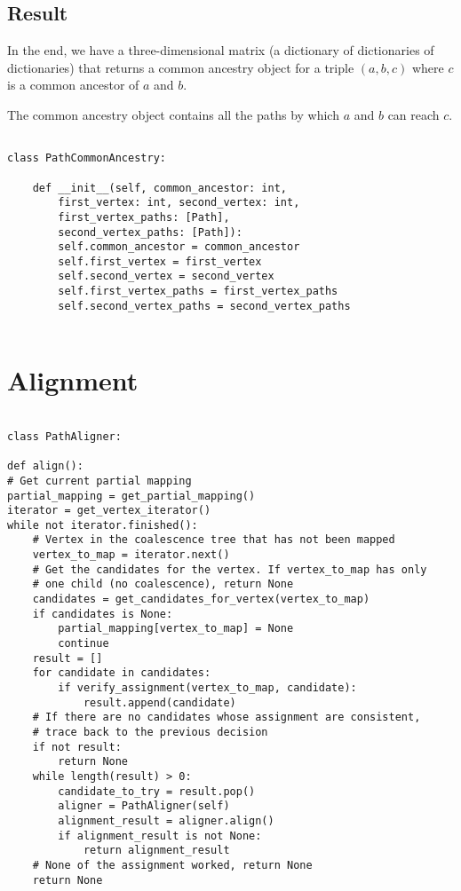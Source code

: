 \documentclass[14pt]{extarticle}
\begin{document}
\subsection{Result}

In the end, we have a three-dimensional matrix (a dictionary of dictionaries of dictionaries) that returns a common ancestry object for a triple $(a, b, c)$ where $c$ is a common ancestor of $a$ and $b$.

The common ancestry object contains all the paths by which $a$ and $b$ can reach $c$.

\begin{lstlisting}

class PathCommonAncestry:
	
	def __init__(self, common_ancestor: int,
		first_vertex: int, second_vertex: int,
		first_vertex_paths: [Path],
		second_vertex_paths: [Path]):
		self.common_ancestor = common_ancestor
		self.first_vertex = first_vertex
		self.second_vertex = second_vertex
		self.first_vertex_paths = first_vertex_paths
		self.second_vertex_paths = second_vertex_paths
	

\end{lstlisting}

\newpage

\section{Alignment}

\vspace*{-\baselineskip}

\begin{lstlisting}

class PathAligner:

def align():
# Get current partial mapping
partial_mapping = get_partial_mapping()
iterator = get_vertex_iterator()
while not iterator.finished():
	# Vertex in the coalescence tree that has not been mapped
	vertex_to_map = iterator.next()
	# Get the candidates for the vertex. If vertex_to_map has only
	# one child (no coalescence), return None
	candidates = get_candidates_for_vertex(vertex_to_map)
	if candidates is None:
		partial_mapping[vertex_to_map] = None
		continue
	result = []
	for candidate in candidates:
		if verify_assignment(vertex_to_map, candidate):
			result.append(candidate)
	# If there are no candidates whose assignment are consistent,
	# trace back to the previous decision
	if not result:
		return None			
	while length(result) > 0:
		candidate_to_try = result.pop()
		aligner = PathAligner(self)
		alignment_result = aligner.align()
		if alignment_result is not None:
			return alignment_result
	# None of the assignment worked, return None
	return None
\end{lstlisting}
\end{document}
